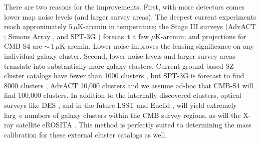 There are two reasons for the improvements.
First, with more detectors comes lower map noise levels (and larger survey areas).
The deepest current experiments reach approximately $5\,\mu$K-arcmin in temperature; the Stage III surveys  (AdvACT \citep{henderson16};  Simons Array \citep{suzuki15}, and SPT-3G \citep{benson14}) forecas\
t a few $\mu$K-arcmin; and projections for CMB-S4 are $\sim$\,1\,$\mu$K-arcmin.
Lower noise improves the lensing significance on any individual galaxy cluster.
Second, lower noise levels and larger survey areas translate into substantially more galaxy clusters.
Current ground-based SZ cluster catalogs have fewer than 1000 clusters \citep{hasselfield13, bleem15}, but SPT-3G is forecast to find 8000 clusters \citep{benson2015_3g}, AdvACT 10,000 clusters \citep{advact_2016} and we assume ad-hoc that CMB-S4 will find 100,000 clusters.
In addition to the internally discovered clusters, optical surveys like DES \citep{rykoff2016}, and in the future LSST \citep{lsst_science_book} and Euclid \citep{euclid_science_book}, will yield extremely larg\
e numbers of galaxy clusters within the CMB survey regions, as will the X-ray satellite eROSITA \citep{erosita_science_book}.
This method is perfectly suited to determining the mass calibration for these external cluster catalogs as well.

